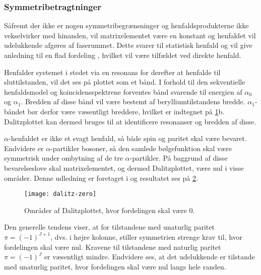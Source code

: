 \begin{figure}[h]
  \centering
  \hfill
  \caption{}
  \label{fig:dalitz-triangle}
\end{figure}

\subsubsection{Symmetribetragtninger}
\label{sec:symbetragt}

Såfremt der ikke er nogen symmetribegrænsninger og henfaldsprodukterne ikke vekselvirker med
hinanden, vil matrixelementet være en konstant og henfaldet vil udelukkende afgøres af
faserummet. Dette svarer til statistisk henfald og vil give anledning til en flad fordeling
\cite{Fedorov}, hvilket vil være tilfældet ved direkte henfald.

Henfalder systemet i stedet via en resonans for derefter at henfalde til sluttilstanden, vil det ses
på plottet som et bånd. I forhold til den sekventielle henfaldsmodel og koincidensspektrene
forventes bånd svarende til energien af $\alpha_{0}$ og $\alpha_{1}$. Bredden af disse bånd vil være bestemt
af berylliumtilstandens bredde. $\alpha_{1}$-båndet bør derfor være væsentligt breddere, hvilket er
indtegnet på \cref{fig:dalitz-triangle}b. Dalitzplottet kan dermed bruges til at identificere
resonanser og bredden af disse.

$\alpha$-henfaldet er ikke et svagt henfald, så både spin og paritet skal være bevaret. Endvidere er
$\alpha$-partikler bosoner, så den samlede bølgefunktion skal være symmetrisk under ombytning af de tre
$\alpha$-partikler. På baggrund af disse bevarelseslove skal matrixelementet, og dermed Dalitzplottet,
være nul i visse områder. Denne udledning er foretaget i \cite{Fedorov} og resultatet ses på
\cref{fig:dalitz-0}.
%
\begin{figure}[h]
  \centering
  \texttt{[image: dalitz-zero]}
  \caption{Områder af Dalitzplottet, hvor fordelingen skal være 0. }
  \label{fig:dalitz-0}
\end{figure}

Den generelle tendens viser, at for tilstandene med unaturlig paritet $\pi = (-1)^{J+1}$, dvs. i højre
kolonne, stiller symmetrien strenge krav til, hvor fordelingen skal være nul. Kravene til
tilstandene med naturlig paritet $\pi = (-1)^{J}$ er væsentligt mindre. Endvidere ses, at det
udelukkende er tilstande med unaturlig paritet, hvor fordelingen skal være nul langs hele randen.

